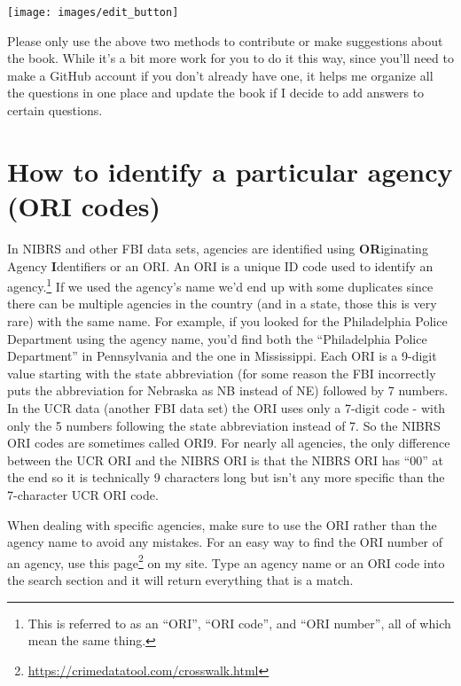 \documentclass[
]{krantz}
\let\origfigure\figure
\let\endorigfigure\endfigure
\renewenvironment{figure}[1][2] {
    \expandafter\origfigure\expandafter[H]
} {
    \endorigfigure
}
\renewcommand{\href}[2]{#2\footnote{\url{#1}}}
\begin{document}
\begin{figure}

{\centering \texttt{[image: images/edit\_button]} 

}

\caption{The edit button for how to make edits of this book.}\label{fig:unnamed-chunk-3}
\end{figure}

Please only use the above two methods to contribute or make
suggestions about the book. While it's a bit more work for
you to do it this way, since you'll need to make a GitHub
account if you don't already have one, it helps me organize
all the questions in one place and update the book if I
decide to add answers to certain questions.

\section{How to identify a particular agency (ORI
codes)}\label{ori}

In NIBRS and other FBI data sets, agencies are identified
using \textbf{OR}iginating Agency \textbf{I}dentifiers or an
ORI. An ORI is a unique ID code used to identify an
agency.\footnote{This is referred to as an ``ORI'', ``ORI
  code'', and ``ORI number'', all of which mean the same
  thing.} If we used the agency's name we'd end up with some
duplicates since there can be multiple agencies in the
country (and in a state, those this is very rare) with the
same name. For example, if you looked for the Philadelphia
Police Department using the agency name, you'd find both the
``Philadelphia Police Department'' in Pennsylvania and the
one in Mississippi. Each ORI is a 9-digit value starting
with the state abbreviation (for some reason the FBI
incorrectly puts the abbreviation for Nebraska as NB instead
of NE) followed by 7 numbers. In the UCR data (another FBI
data set) the ORI uses only a 7-digit code - with only the 5
numbers following the state abbreviation instead of 7. So
the NIBRS ORI codes are sometimes called ORI9. For nearly
all agencies, the only difference between the UCR ORI and
the NIBRS ORI is that the NIBRS ORI has ``00'' at the end so
it is technically 9 characters long but isn't any more
specific than the 7-character UCR ORI code.

When dealing with specific agencies, make sure to use the
ORI rather than the agency name to avoid any mistakes. For
an easy way to find the ORI number of an agency, use
\href{https://crimedatatool.com/crosswalk.html}{this page}
on my site. Type an agency name or an ORI code into the
search section and it will return everything that is a
match.
\end{document}
